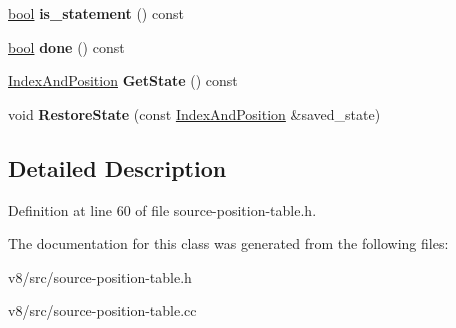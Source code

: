 \begin{DoxyCompactItemize}
\mbox{\hyperlink{classbool}{bool}} {\bfseries is\+\_\+statement} () const
\item 
\mbox{\label{classv8_1_1internal_1_1SourcePositionTableIterator_a0845f40c6af62abe649e2a543efc057d}} 
\mbox{\hyperlink{classbool}{bool}} {\bfseries done} () const
\item 
\mbox{\label{classv8_1_1internal_1_1SourcePositionTableIterator_a31d661c7d346ccc7101d4ef43501c56d}} 
\mbox{\hyperlink{structv8_1_1internal_1_1SourcePositionTableIterator_1_1IndexAndPosition}{Index\+And\+Position}} {\bfseries Get\+State} () const
\item 
\mbox{\label{classv8_1_1internal_1_1SourcePositionTableIterator_a8041a21b3e3c0a85a536b20eef1d33f4}} 
void {\bfseries Restore\+State} (const \mbox{\hyperlink{structv8_1_1internal_1_1SourcePositionTableIterator_1_1IndexAndPosition}{Index\+And\+Position}} \&saved\+\_\+state)
\end{DoxyCompactItemize}


\subsection{Detailed Description}


Definition at line 60 of file source-\/position-\/table.\+h.



The documentation for this class was generated from the following files\+:\begin{DoxyCompactItemize}
\item 
v8/src/source-\/position-\/table.\+h\item 
v8/src/source-\/position-\/table.\+cc\end{DoxyCompactItemize}
